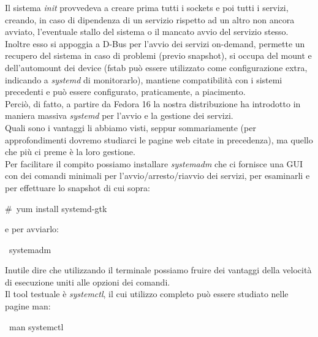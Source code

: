 Il sistema {\itshape init} provvedeva a creare prima tutti i sockets e poi tutti i servizi, creando, in caso di dipendenza di un servizio rispetto ad un altro non ancora avviato, l'eventuale stallo del sistema o il mancato avvio del servizio stesso.\\

Inoltre esso si appoggia a D-Bus per l'avvio dei servizi on-demand, permette un recupero del sistema in caso di problemi (previo snapshot), si occupa del mount e dell'automount dei device (fstab può essere utilizzato come configurazione extra, indicando a {\itshape systemd} di monitorarlo), mantiene compatibilità con i sistemi precedenti e può essere configurato, praticamente, a piacimento.\\

Perciò, di fatto, a partire da Fedora 16 la nostra distribuzione ha introdotto in maniera massiva {\itshape systemd} per l'avvio e la gestione dei servizi.\\

Quali sono i vantaggi li abbiamo visti, seppur sommariamente (per approfondimenti dovremo studiarci le pagine web citate in precedenza), ma quello che più ci preme è la loro gestione.\\

Per facilitare il compito possiamo installare {\itshape systemadm} che ci fornisce una GUI con dei comandi minimali per l'avvio/ar\-resto/riavvio dei servizi, per esaminarli e per effettuare lo snapshot di cui sopra:

\begin{shaded}
{\color[cmyk]{0, 0, 0, 0}\#\ yum install systemd-gtk}
\end{shaded}
e per avviarlo: 
\begin{shaded}
{\color[cmyk]{0, 0, 0, 0}\textdollar\ systemadm}
\end{shaded}

Inutile dire che utilizzando il terminale possiamo fruire dei vantaggi della velocità di esecuzione uniti alle opzioni dei comandi.\\

Il tool testuale è {\itshape systemctl}, il cui utilizzo completo può essere studiato nelle pagine man:

\begin{shaded}
{\color[cmyk]{0, 0, 0, 0}\textdollar\ man systemctl}
\end{shaded}

